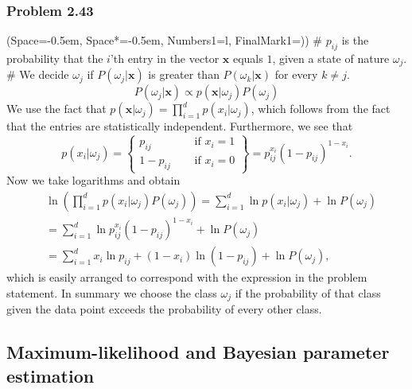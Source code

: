 \documentclass[12pt, a4paper]{article}
\newcommand{\listSpace}{-0.5em}%
\newcommand{\vect}[1]{\bm{#1}}
\begin{document}
\subsubsection*{Problem 2.43}
\begin{easylist}[enumerate]
	\ListProperties(Space=\listSpace, Space*=\listSpace, Numbers1=l, FinalMark1={)})
	# $p_{ij}$ is the probability that the $i$'th entry in the vector $\vect{x}$ equals $1$, given a state of nature $\omega_j$.
	# We decide $\omega_j$ if $P(\omega_j | \vect{x})$ is greater than $P(\omega_k | \vect{x})$ for every $k \neq j$.
	\begin{equation*}
	P(\omega_j | \vect{x}) \propto p(  \vect{x} | \omega_j) P(\omega_j)
	\end{equation*}
	We use the fact that $p(  \vect{x} | \omega_j) = \prod_{i = 1}^{d} p(  x_i| \omega_j)$, which follows from the fact that the entries are statistically independent.
	Furthermore, we see that
	\begin{equation*}
	p(  x_i| \omega_j) = 
	\left\{\!\begin{aligned}
	p_{ij} &\quad \text{ if } x_i = 1 \\
	1 - p_{ij} &\quad \text{ if } x_i = 0 
	\end{aligned}\right\} = 
	p_{ij}^{x_i} \left( 1 - p_{ij}\right)^{ 1 - x_i}.
	\end{equation*}
	Now we take logarithms and  obtain
	\begin{align*}
	& \ln \left( \prod_{i = 1}^{d} p(  x_i| \omega_j) P(\omega_j) \right) =
	\sum_{i = 1}^{d} \ln p(  x_i| \omega_j)  + \ln P(\omega_j) \\
	& = \sum_{i = 1}^{d} \ln p_{ij}^{x_i} \left( 1 - p_{ij}\right)^{ 1 - x_i}  + \ln P(\omega_j) \\
	&
	= \sum_{i = 1}^{d} x_i \ln p_{ij} + (1 - x_i) \ln ( 1 - p_{ij})  + \ln P(\omega_j),
	\end{align*}
	which is easily arranged to correspond with the expression in the problem statement. 
	In summary we choose the class $\omega_j$ if the probability of that class given the data point exceeds the probability of every other class.
\end{easylist}




\subsection{Maximum-likelihood and Bayesian parameter estimation}
\end{document}

